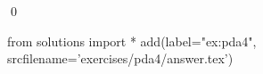 
\begin{ex} 
  \label{ex:pda4}
  
  \qed
\end{ex} 
\begin{python0}
from solutions import *
add(label="ex:pda4",
    srcfilename='exercises/pda4/answer.tex') 
\end{python0}
